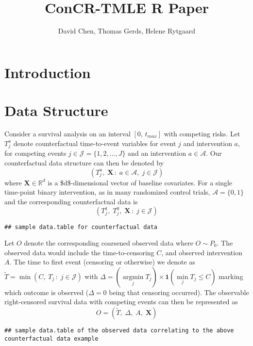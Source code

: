 \documentclass{report}
\author{David Chen, Thomas Gerds, Helene Rytgaard}
\date{}
\title{ConCR-TMLE R Paper}
\newcommand{\1}{\ensuremath{\mathbf{1}}}
\DeclareMathOperator*{\argmin}{argmin}
\newcommand{\T}{\ensuremath{\widetilde{T}}}
\newcommand{\X}{\ensuremath{\mathbf{X}}}
\begin{document}
\maketitle
{}

\section*{Introduction}
\label{sec:org3d0f01a}

\section*{Data Structure}
\label{sec:orgabf1270}

Consider a survival analysis on an interval \([0,\,t_{max}]\) with competing risks. Let \(T^a_j\) denote counterfactual time-to-event variables for event \(j\) and intervention \(a\), for competing events \(j \in \mathcal{J} = \{1, 2, \dots, J\}\) and an intervention \(a \in \mathcal{A}\). Our counterfactual data structure can then be denoted by
\[(T^a_j,\;\X\,:\;a\in\mathcal{A},\;j\in\mathcal{J})\]
where \(\X \in \mathbb{R}^d\) is a \$d\$-dimensional vector of baseline covariates. For a single time-point binary intervention, as in many randomized control trials, \(\mathcal{A} = \{0, 1\}\) and the corresponding counterfactual data is 
\[ (T^1_j,\; T^0_j,\;\X\,: \;j\in\mathcal{J})\]

\begin{lstlisting}
## sample data.table for counterfactual data
\end{lstlisting}

\noindent Let $O$ denote the corresponding coarsened observed data where $O \sim P_0$. The observed data would include the time-to-censoring $C$, and observed intervention $A$. The time to first event (censoring or otherwise) we denote as $\T = \min(C,\; T_j\,: \; j \in \mathcal{J})$ with $\Delta = (\argmin\limits_j T_j) \times \1(\min\limits_j T_j \leq C)$ marking which outcome is observed ($\Delta = 0$ being that censoring occurred). The observable right-censored survival data with competing events can then be represented as 
\[O = (\T,\;\Delta,\;A,\;\X)\]

\begin{lstlisting}
## sample data.table of the observed data correlating to the above counterfactual data example
\end{lstlisting}
\end{document}
